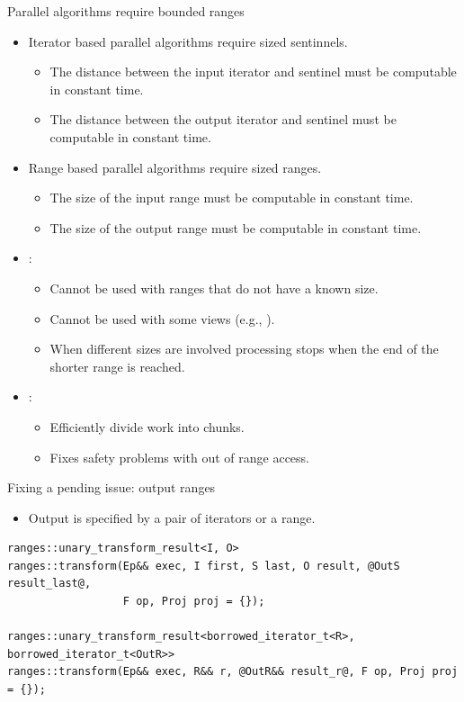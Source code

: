\begin{frame}[t,fragile]{Parallel algorithms require bounded ranges}
\begin{itemize}
  \item Iterator based parallel algorithms require sized sentinnels.
    \begin{itemize}
      \item The distance between the input iterator and sentinel must be computable in constant time.
      \item The distance between the output iterator and sentinel must be computable in constant time.
    \end{itemize}

  \item Range based parallel algorithms require sized ranges.
    \begin{itemize}
      \item The size of the input range must be computable in constant time.
      \item The size of the output range must be computable in constant time.
    \end{itemize}

  \item {}:
    \begin{itemize}
      \item Cannot be used with ranges that do not have a known size.
      \item Cannot be used with some views (e.g., ).
      \item When different sizes are involved processing stops when the end of the shorter range is reached.
    \end{itemize}

  \item {}:
    \begin{itemize}
        \item Efficiently divide work into chunks.
        \item Fixes safety problems with out of range access.
    \end{itemize}
\end{itemize}
\end{frame}

\begin{frame}[t,fragile]{Fixing a pending issue: output ranges}
\begin{itemize}
  \item Output is specified by a pair of iterators or a range.
\end{itemize}
  
\begin{lstlisting}
ranges::unary_transform_result<I, O>
ranges::transform(Ep&& exec, I first, S last, O result, @OutS result_last@,
                  F op, Proj proj = {});

ranges::unary_transform_result<borrowed_iterator_t<R>, borrowed_iterator_t<OutR>>
ranges::transform(Ep&& exec, R&& r, @OutR&& result_r@, F op, Proj proj = {});
\end{lstlisting}
\end{frame}